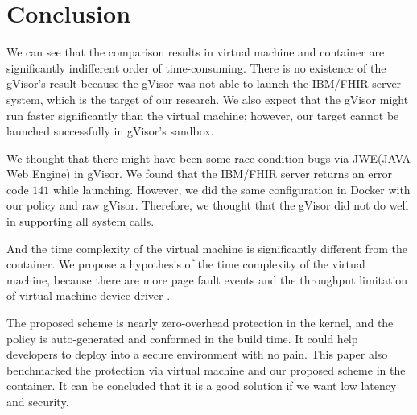 \section{Conclusion}

We can see that the comparison results in virtual machine and container are
significantly indifferent order of time-consuming. There is no existence
of the gVisor's result because the gVisor was not able to launch the
IBM/FHIR server system, which is the target of our research.
We also expect that the gVisor might run faster significantly than the virtual
machine; however, our target cannot be launched successfully in
gVisor's sandbox.

We thought that there might have been some race condition bugs via JWE(JAVA Web
Engine) in gVisor. We found that the IBM/FHIR server returns an error code $141$
while launching. However, we did the same configuration in Docker with
our policy and raw gVisor. Therefore, we thought that the gVisor did not do
well in supporting all system calls.

And the time complexity of the virtual machine is significantly different from
the container. We propose a hypothesis of the time complexity of the virtual
machine, because there are more page fault events and the throughput limitation
of virtual machine device driver \cite{10.5555/1267569.1267570,7095802}.

The proposed scheme is nearly zero-overhead protection in the kernel, and
the policy is auto-generated and conformed in the build time. It could help
developers to deploy into a secure environment with no pain. This paper also
benchmarked the protection via virtual machine and our proposed scheme in
the container. It can be concluded that it is a good solution if we want
low latency and security.



